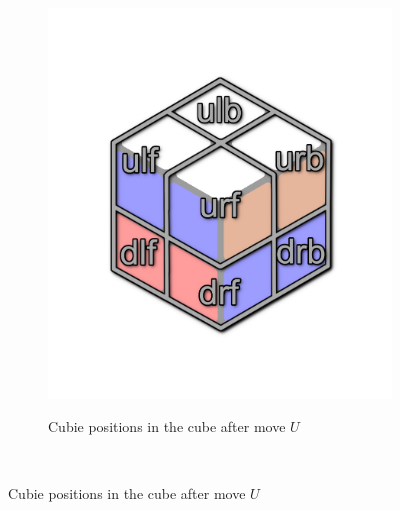 \documentclass[12pt,a4paper]{article}
\theoremstyle{custom}
\begin{document}
\begin{figure}[h]
\begin{minipage}[b][][b]{0.04\textwidth}$\ $
\end{minipage}\begin{minipage}[b][][b]{0.43\textwidth}

\begin{figure}[H]
\centering
\includegraphics[scale=0.15]{caged_spin.png}\\
\caption{Cubie positions in the cube after move $U$}
\label{Figure_CubiePositionNameAfterU-1}
\end{figure}

\end{minipage}\begin{minipage}[b][][b]{0.06\textwidth}$\ $ \end{minipage}\begin{minipage}[b][][b]{0.43\textwidth}


\end{minipage}
\end{figure}
\end{document}
